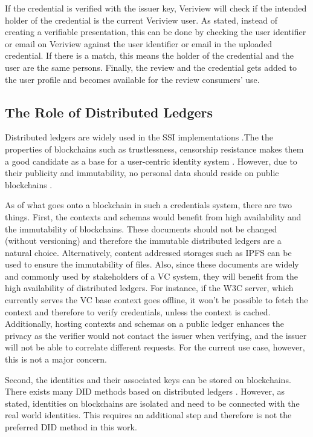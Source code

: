 If the credential is verified with the issuer key, Veriview will check if the intended holder of the credential is the current Veriview user. As stated, instead of creating a verifiable presentation, this can be done by checking the user identifier or email on Veriview against the user identifier or email in the uploaded credential. If there is a match, this means the holder of the credential and the user are the same persons. Finally, the review and the credential gets added to the user profile and becomes available for the review consumers' use.

\subsection{The Role of Distributed Ledgers}

Distributed ledgers are widely used in the \acrshort{SSI} implementations \parencite{vanBokkem.29Nis2019}.The the properties of blockchains such as trustlessness, censorship resistance \parencite{DiFrancescoMaesa.2020} makes them a good candidate as a base for a user-centric identity system \parencite{cameron2009appendix}.
However, due to their publicity and immutability, no personal data should reside on public blockchains \parencite{blockchain-gdpr}. 

As of what goes onto a blockchain in such a credentials system, there are two things. First, the contexts and schemas would benefit from high availability and the immutability of blockchains. These documents should not be changed (without versioning) and therefore the immutable distributed ledgers are a natural choice. Alternatively, content addressed storages such as \acrshort{IPFS} can be used to ensure the immutability of files. Also, since these documents are widely and commonly used by stakeholders of a \acrshort{VC} system, they will benefit from the high availability of distributed ledgers. For instance, if the \acrshort{W3C} server, which currently serves the \acrshort{VC} base context goes offline, it won't be possible to fetch the context and therefore to verify credentials, unless the context is cached. Additionally, hosting contexts and schemas on a public ledger enhances the privacy as the verifier would not contact the issuer when verifying, and the issuer will not be able to correlate different requests. For the current use case, however, this is not a major concern. 

Second, the identities and their associated keys can be stored on blockchains. There exists many \acrshort{DID} methods based on distributed ledgers \parencite{did-spec-registry}. However, as stated, identities on blockchains are isolated and need to be connected with the real world identities. This requires an additional step and therefore is not the preferred \acrshort{DID} method in this work. 


